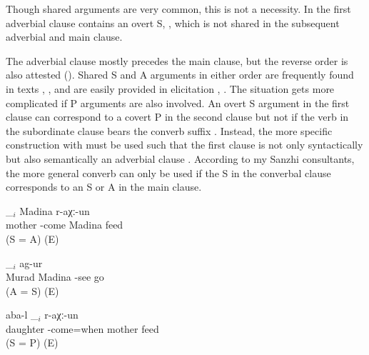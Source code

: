 Though shared arguments are very common, this is not a necessity. In  the first adverbial clause contains an overt S, , which is not shared in the subsequent adverbial and main clause.

The adverbial clause mostly precedes the main clause, but the reverse order is also attested (). Shared S and A arguments in either order are frequently found in texts , , and are easily provided in elicitation , . The situation gets more complicated if P arguments are also involved. An overt S argument in the first clause can correspond to a covert P in the second clause but not if the verb in the subordinate clause bears the converb suffix . Instead, the more specific construction with  must be used such that the first clause is not only syntactically but also semantically an adverbial clause . According to my Sanzhi consultants, the more general converb  can only be used if the S in the converbal clause corresponds to an S or A in the main clause.
%
\begin{exe}
	\ex	\label{ex:Mother, Madina, feeding@39}
	\begin{xlist}
		\ex	\label{ex:Mother came and fed Madina@39a}
		\gll	[aba$_{i}$	sa-r-eʁ-ib-le]	\_$_{i}$	Madina	r-aχː-un\\
			mother	-come		Madina	feed\\
		\glt	{} (S = A) (E)

		\ex	\label{ex:Murad saw Madina and went away@39b}
			\_$_{i}$	ag-ur\\
			Murad	Madina	-see		go\\
		\glt	{} (A = S) (E)

		\ex	\label{ex:When the daughter came, the mother fed@39c}
		\gll	[rursːi$_{i}$	sa-r-eʁ-ib=qːella]	aba-l	\_$_{i}$	r-aχː-un\\
			daughter	-come=when	mother		feed\\
		\glt	{} (S = P) (E)
	\end{xlist}
\end{exe}

